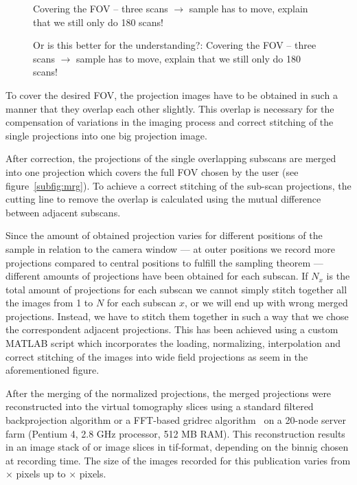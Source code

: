 \begin{figure*}[tb]
	\centering
	
	\caption{Covering the FOV -- three scans $\rightarrow$ sample has to move, explain that we still only do \unit{180}{\degree} scans!}
	\label{fig:covering-three scans a}
\end{figure*}

\begin{figure*}[tb]
	\centering
	
	\caption{Or is this better for the understanding?: Covering the FOV -- three scans $\rightarrow$ sample has to move, explain that we still only do \unit{180}{\degree} scans!}
	\label{fig:covering-three scans b}
\end{figure*}

To cover the desired FOV, the projection images have to be obtained in such a manner that they overlap each other slightly. This overlap is necessary for the compensation of variations in the imaging process and correct stitching of the single projections into one big projection image. 

After correction, the projections of the single overlapping subscans are merged into one projection which covers the full FOV chosen by the user (see figure~\ref{subfig:mrg}). To achieve a correct stitching of the sub-scan projections, the cutting line to remove the overlap is calculated using the mutual difference between adjacent subscans.

Since the amount of obtained projection varies for different positions of the sample in relation to the camera window --- at outer positions we record more projections compared to central positions to fulfill the sampling theorem --- different amounts of projections have been obtained for each subscan. If $N_x$ is the total amount of projections for each subscan we cannot simply stitch together all the images from 1 to $N$ for each subscan $x$, or we will end up with wrong merged projections. Instead, we have to stitch them together in such a way that we chose the correspondent adjacent projections.  This has been achieved using a custom MATLAB\textsuperscript{\textregistered} script which incorporates the loading, normalizing, interpolation and correct stitching of the images into wide field projections as seem in the aforementioned figure.

After the merging of the normalized projections, the merged projections were reconstructed into the virtual tomography slices using a standard filtered backprojection algorithm or a FFT-based gridrec algorithm~\cite{Dowd2003} on a 20-node server farm (Pentium 4, 2.8 GHz processor, 512 MB RAM). This reconstruction results in an image stack of  or  image slices in tif-format, depending on the binnig chosen at recording time. The size of the images recorded for this publication varies from $\times$ pixels up to $\times$ pixels.